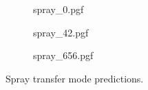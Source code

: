 \begin{figure}
\centering
  \begin{subfigure}[b]{0.45\textwidth}
    {spray_0.pgf}
    \caption{}

  \end{subfigure}
\hfill
  \begin{subfigure}[b]{0.45\textwidth}
    {spray_42.pgf}
    \caption{}
  \end{subfigure}
  \begin{subfigure}[b]{0.45\textwidth}
    {spray_656.pgf}
    \caption{}
  \end{subfigure}
    \caption[Spray transfer mode predictions]{Spray transfer mode predictions.}
    \label{fig:spray_centroids}
\end{figure}
